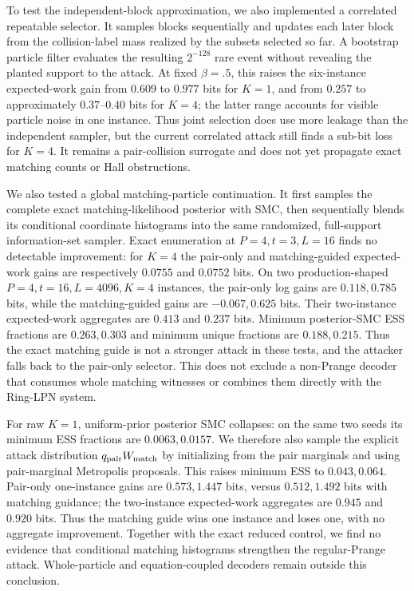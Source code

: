 To test the independent-block approximation, we also implemented a
correlated repeatable selector.  It samples blocks sequentially and updates
each later block from the collision-label mass realized by the subsets
selected so far.  A bootstrap particle filter evaluates the resulting
$2^{-128}$ rare event without revealing the planted support to the attack.
At fixed $\beta=.5$, this raises the six-instance expected-work gain from
$0.609$ to $0.977$ bits for $K=1$, and from $0.257$ to approximately
$0.37$--$0.40$ bits for $K=4$; the latter range accounts for visible particle
noise in one instance.  Thus joint selection does use more leakage than the
independent sampler, but the current correlated attack still finds a sub-bit
loss for $K=4$.  It remains a pair-collision surrogate and does not yet
propagate exact matching counts or Hall obstructions.

We also tested a global matching-particle continuation.  It first samples the
complete exact matching-likelihood posterior with SMC, then sequentially
blends its conditional coordinate histograms into the same randomized,
full-support information-set sampler.  Exact enumeration at
$P=4,t=3,L=16$ finds no detectable improvement: for $K=4$ the pair-only and
matching-guided expected-work gains are respectively $0.0755$ and $0.0752$
bits.  On two production-shaped $P=4,t=16,L=4096,K=4$ instances, the
pair-only log gains are $0.118,0.785$ bits, while the matching-guided gains are
$-0.067,0.625$ bits.  Their two-instance expected-work aggregates are $0.413$
and $0.237$ bits.  Minimum posterior-SMC ESS fractions are $0.263,0.303$ and
minimum unique fractions are $0.188,0.215$.  Thus the exact matching guide is
not a stronger attack in these tests, and the attacker falls back to the
pair-only selector.  This does not exclude a non-Prange decoder that consumes
whole matching witnesses or combines them directly with the Ring-LPN system.

For raw $K=1$, uniform-prior posterior SMC collapses: on the same two seeds its
minimum ESS fractions are $0.0063,0.0157$.  We therefore also sample the
explicit attack distribution $q_{\rm pair}W_{\rm match}$ by initializing from
the pair marginals and using pair-marginal Metropolis proposals.  This raises
minimum ESS to $0.043,0.064$.  Pair-only one-instance gains are $0.573,1.447$
bits, versus $0.512,1.492$ bits with matching guidance; the two-instance
expected-work aggregates are $0.945$ and $0.920$ bits.  Thus the matching guide
wins one instance and loses one, with no aggregate improvement.  Together
with the exact reduced control, we find no evidence that conditional matching
histograms strengthen the regular-Prange attack.  Whole-particle and
equation-coupled decoders remain outside this conclusion.


